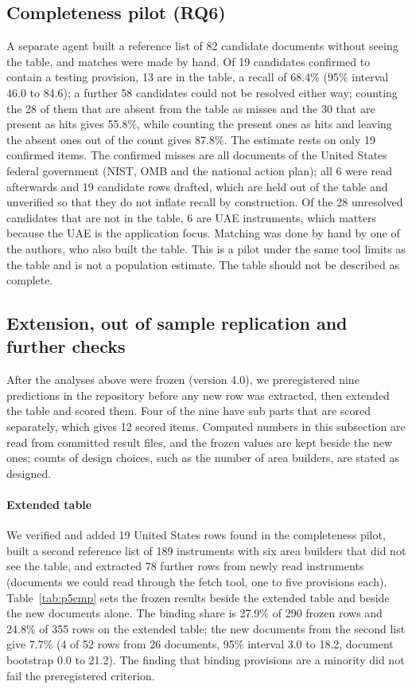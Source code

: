 \documentclass[conference]{IEEEtran}
\begin{document}
\subsection{Completeness pilot (RQ6)}\label{sec:complete}
A separate agent built a reference list of 82 candidate documents without seeing the table, and matches were made by hand. Of 19 candidates confirmed to contain a testing provision, 13 are in the table, a recall of 68.4\% (95\% interval 46.0 to 84.6); a further 58 candidates could not be resolved either way; counting the 28 of them that are absent from the table as misses and the 30 that are present as hits gives 55.8\%, while counting the present ones as hits and leaving the absent ones out of the count gives 87.8\%. The estimate rests on only 19 confirmed items. The confirmed misses are all documents of the United States federal government (NIST, OMB and the national action plan); all 6 were read afterwards and 19 candidate rows drafted, which are held out of the table and unverified so that they do not inflate recall by construction. Of the 28 unresolved candidates that are not in the table, 6 are UAE instruments, which matters because the UAE is the application focus. Matching was done by hand by one of the authors, who also built the table. This is a pilot under the same tool limits as the table and is not a population estimate. The table should not be described as complete.

\subsection{Extension, out of sample replication and further checks}\label{sec:phase5}
After the analyses above were frozen (version 4.0), we preregistered nine predictions in the repository before any new row was extracted, then extended the table and scored them. Four of the nine have sub parts that are scored separately, which gives 12 scored items. Computed numbers in this subsection are read from committed result files, and the frozen values are kept beside the new ones; counts of design choices, such as the number of area builders, are stated as designed.

\paragraph{Extended table} We verified and added 19 United States rows found in the completeness pilot, built a second reference list of 189 instruments with six area builders that did not see the table, and extracted 78 further rows from newly read instruments (documents we could read through the fetch tool, one to five provisions each). Table~\ref{tab:p5cmp} sets the frozen results beside the extended table and beside the new documents alone. The binding share is 27.9\% of 290 frozen rows and 24.8\% of 355 rows on the extended table; the new documents from the second list give 7.7\% (4 of 52 rows from 26 documents, 95\% interval 3.0 to 18.2, document bootstrap 0.0 to 21.2). The finding that binding provisions are a minority did not fail the preregistered criterion.
\end{document}
